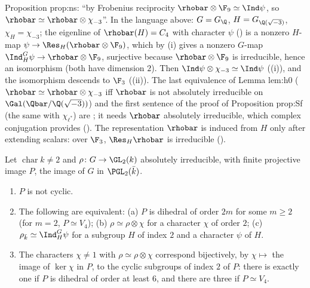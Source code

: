 \begin{paperlink}
Proposition prop:ns: ``by Frobenius reciprocity $\rhobar\otimes\F_9\simeq\Ind\psi$, so $\rhobar\simeq\rhobar\otimes\chi_{-3}$''. In the language above: $G=G_\Q$, $H=G_{\Q(\sqrt{-3})}$,
$\chi_H=\chi_{-3}$; the eigenline of $\rhobar(H)=C_4$ with character $\psi$ () is a nonzero $H$-map $\psi\to\Res_H(\rhobar\otimes\F_9)$, which
by (i) gives a nonzero $G$-map $\Ind_H^G\psi\to\rhobar\otimes\F_9$, surjective because $\rhobar\otimes\F_9$ is irreducible, hence
an isomorphism (both have dimension $2$). Then $\Ind\psi\otimes\chi_{-3}\simeq\Ind\psi$ ((i)), and the isomorphism
descends to $\F_3$ ((ii)). The last equivalence of Lemma lem:h0 ($\rhobar\simeq\rhobar\otimes\chi_{-3}$ iff $\rhobar$ is not absolutely
irreducible on $\Gal(\Qbar/\Q(\sqrt{-3}))$) and the first sentence of the proof of Proposition prop:Sf (the same with $\chi_{\ell^*}$) are
; it needs $\rhobar$ absolutely irreducible, which complex conjugation provides
(). The representation $\rhobar$ is induced from $H$ only after extending scalars: over $\F_3$, $\Res_H\rhobar$ is
irreducible ().
\end{paperlink}

\begin{proposition}\label{prop:reps:dihedral}
Let $\operatorname{char}k\ne2$ and $\rho\colon G\to\GL_2(k)$ absolutely irreducible, with finite projective image $P$, the image of $G$ in $\PGL_2(\bar k)$.
\begin{enumerate}[label=(\roman*)]
\item $P$ is not cyclic.
\item The following are equivalent: (a) $P$ is dihedral of order $2m$ for some $m\ge2$ (for $m=2$, $P\simeq V_4$); (b) $\rho\simeq\rho\otimes\chi$ for a
character $\chi$ of order $2$; (c) $\rho_{\bar k}\simeq\Ind_H^G\psi$ for a subgroup $H$ of index $2$ and a character $\psi$ of $H$.
\item The characters $\chi\ne1$ with $\rho\simeq\rho\otimes\chi$ correspond bijectively, by $\chi\mapsto$ the image of $\ker\chi$ in $P$, to the cyclic
subgroups of index $2$ of $P$: there is exactly one if $P$ is dihedral of order at least $6$, and there are three if $P\simeq V_4$.
\end{enumerate}
\end{proposition}

